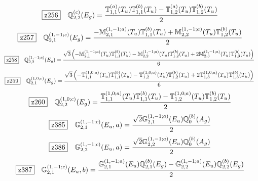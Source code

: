 \documentclass[fleqn,10pt,landscape]{jsarticle}
\begin{document}
\begin{dmath*}
\hspace*{3mm}\fbox{z256}\quad \mathbb{Q}_{2,2}^{(c)}(E_{g})=\frac{\mathbb{T}_{1,1}^{(a)}(T_{u}) \mathbb{T}_{1,1}^{(b)}(T_{u}) - \mathbb{T}_{1,2}^{(a)}(T_{u}) \mathbb{T}_{1,2}^{(b)}(T_{u})}{2}
\end{dmath*}
\begin{dmath*}
\hspace*{3mm}\fbox{z257}\quad \mathbb{Q}_{2,1}^{(1,-1;c)}(E_{g})=\frac{- \mathbb{M}_{2,1}^{(1,-1;a)}(T_{u}) \mathbb{T}_{1,1}^{(b)}(T_{u}) + \mathbb{M}_{2,2}^{(1,-1;a)}(T_{u}) \mathbb{T}_{1,2}^{(b)}(T_{u})}{2}
\end{dmath*}
\begin{dmath*}
\hspace*{3mm}\fbox{z258}\quad \mathbb{Q}_{2,2}^{(1,-1;c)}(E_{g})=\frac{\sqrt{3} \left(- \mathbb{M}_{2,1}^{(1,-1;a)}(T_{u}) \mathbb{T}_{1,1}^{(b)}(T_{u}) - \mathbb{M}_{2,2}^{(1,-1;a)}(T_{u}) \mathbb{T}_{1,2}^{(b)}(T_{u}) + 2 \mathbb{M}_{2,3}^{(1,-1;a)}(T_{u}) \mathbb{T}_{1,3}^{(b)}(T_{u})\right)}{6}
\end{dmath*}
\begin{dmath*}
\hspace*{3mm}\fbox{z259}\quad \mathbb{Q}_{2,1}^{(1,0;c)}(E_{g})=\frac{\sqrt{3} \left(- \mathbb{T}_{1,1}^{(1,0;a)}(T_{u}) \mathbb{T}_{1,1}^{(b)}(T_{u}) - \mathbb{T}_{1,2}^{(1,0;a)}(T_{u}) \mathbb{T}_{1,2}^{(b)}(T_{u}) + 2 \mathbb{T}_{1,3}^{(1,0;a)}(T_{u}) \mathbb{T}_{1,3}^{(b)}(T_{u})\right)}{6}
\end{dmath*}
\begin{dmath*}
\hspace*{3mm}\fbox{z260}\quad \mathbb{Q}_{2,2}^{(1,0;c)}(E_{g})=\frac{\mathbb{T}_{1,1}^{(1,0;a)}(T_{u}) \mathbb{T}_{1,1}^{(b)}(T_{u}) - \mathbb{T}_{1,2}^{(1,0;a)}(T_{u}) \mathbb{T}_{1,2}^{(b)}(T_{u})}{2}
\end{dmath*}
\begin{dmath*}
\hspace*{3mm}\fbox{z385}\quad \mathbb{G}_{2,1}^{(1,-1;c)}(E_{u},a)=\frac{\sqrt{2} \mathbb{G}_{2,1}^{(1,-1;a)}(E_{u}) \mathbb{Q}_{0}^{(b)}(A_{g})}{2}
\end{dmath*}
\begin{dmath*}
\hspace*{3mm}\fbox{z386}\quad \mathbb{G}_{2,2}^{(1,-1;c)}(E_{u},a)=\frac{\sqrt{2} \mathbb{G}_{2,2}^{(1,-1;a)}(E_{u}) \mathbb{Q}_{0}^{(b)}(A_{g})}{2}
\end{dmath*}
\begin{dmath*}
\hspace*{3mm}\fbox{z387}\quad \mathbb{G}_{2,1}^{(1,-1;c)}(E_{u},b)=\frac{\mathbb{G}_{2,1}^{(1,-1;a)}(E_{u}) \mathbb{Q}_{2,1}^{(b)}(E_{g}) - \mathbb{G}_{2,2}^{(1,-1;a)}(E_{u}) \mathbb{Q}_{2,2}^{(b)}(E_{g})}{2}
\end{dmath*}
\end{document}
